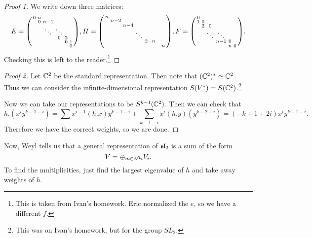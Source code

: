 \documentclass[twoside, 10pt]{article}
\begin{document}
    \begin{proof}[Proof 1] We write down three matrices:\[E =
        \begin{psmallmatrix} 0 & n \\ & 0 & n-1 \\ & & \ddots & \ddots \\ & & &
            0 & 2 \\ & & & & 0 & 1 \\ & & & & & 0 \end{psmallmatrix}, H =
            \begin{psmallmatrix} n \\ & n-2 \\ & & n-4 \\ & & & \ddots \\ & & &
            & 2-n \\ & & & & & -n \end{psmallmatrix}, F = \begin{psmallmatrix}
            0  \\ 1 & 0 & \\ & 2 & 0  \\ & & \ddots & \ddots \\ & & & n-1 & 0
                 \\ & & & & n & 0 \end{psmallmatrix}.\] Checking this is left
             to the reader.\footnote{This is taken from Ivan's homework. Eric
         normalized the $e$, so we have a different $f$.} \end{proof}

    \begin{proof}[Proof 2] Let $\mathbb{C}^2$ be the standard representation. Then note
        that $(\mathbb{C}^2)^* \simeq \mathbb{C}^2$. Thus we can consider the
        infinite-dimensional representation $S(V^*) = S(\mathbb{C}^2)$.\footnote{This
        was on Ivan's homework, but for the group $SL_2$.}

        Now we can take our representations to be $S^{k-1}(\mathbb{C}^2)$. Then we can
        check that \[h.(x^iy^{k-1-i}) = \sum x^{i-1}(h.x) y^{k-1-i} +
        \sum_{k-1-i}x^i(h.y)(y^{k-2-i}) = (-k+1+2i)x^iy^{k-1-i}.\] Therefore we
        have the correct weights, so we are done.  \end{proof}

    Now, Weyl tells us that a general representation of $\mathfrak{sl}_2$ is a sum of
    the form \[ V = \oplus_{m \in \mathbb{Z}} a_iV_i.\] To find the multiplicities,
    just find the largest eigenvalue of $h$ and take away weights of $h$.
\end{document}
